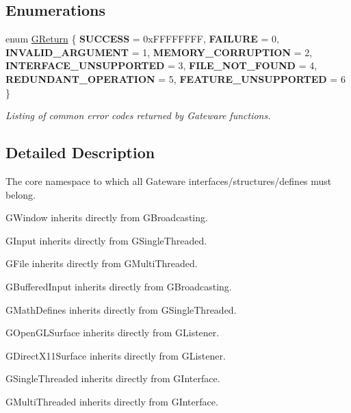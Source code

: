 \subsection*{Enumerations}
\begin{DoxyCompactItemize}
\item 
\mbox{\label{namespaceGW_a67a839e3df7ea8a5c5686613a7a3de21}} 
enum \hyperlink{namespaceGW_a67a839e3df7ea8a5c5686613a7a3de21}{G\+Return} \{ \newline
{\bfseries S\+U\+C\+C\+E\+SS} = 0x\+F\+F\+F\+F\+F\+F\+FF, 
{\bfseries F\+A\+I\+L\+U\+RE} = 0, 
{\bfseries I\+N\+V\+A\+L\+I\+D\+\_\+\+A\+R\+G\+U\+M\+E\+NT} = 1, 
{\bfseries M\+E\+M\+O\+R\+Y\+\_\+\+C\+O\+R\+R\+U\+P\+T\+I\+ON} = 2, 
\newline
{\bfseries I\+N\+T\+E\+R\+F\+A\+C\+E\+\_\+\+U\+N\+S\+U\+P\+P\+O\+R\+T\+ED} = 3, 
{\bfseries F\+I\+L\+E\+\_\+\+N\+O\+T\+\_\+\+F\+O\+U\+ND} = 4, 
{\bfseries R\+E\+D\+U\+N\+D\+A\+N\+T\+\_\+\+O\+P\+E\+R\+A\+T\+I\+ON} = 5, 
{\bfseries F\+E\+A\+T\+U\+R\+E\+\_\+\+U\+N\+S\+U\+P\+P\+O\+R\+T\+ED} = 6
 \}\begin{DoxyCompactList}\small\item\em Listing of common error codes returned by Gateware functions. \end{DoxyCompactList}
\end{DoxyCompactItemize}


\subsection{Detailed Description}
The core namespace to which all Gateware interfaces/structures/defines must belong. 

G\+Window inherits directly from G\+Broadcasting.

G\+Input inherits directly from G\+Single\+Threaded.

G\+File inherits directly from G\+Multi\+Threaded.

G\+Buffered\+Input inherits directly from G\+Broadcasting.

G\+Math\+Defines inherits directly from G\+Single\+Threaded.

G\+Open\+G\+L\+Surface inherits directly from G\+Listener.

G\+Direct\+X11\+Surface inherits directly from G\+Listener.

G\+Single\+Threaded inherits directly from G\+Interface.

G\+Multi\+Threaded inherits directly from G\+Interface.

